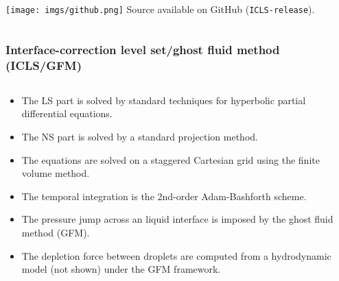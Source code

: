 \begin{frame}[noframenumbering]
\begin{columns}
    \begin{column}{0.2\textwidth}
      \pause
      \vskip4cm
      \centering
      \texttt{[image: imgs/github.png]}
      \vskip0.1cm
      Source available on GitHub (\texttt{ICLS-release}).
    \end{column}
    
  \end{columns}

\end{frame}
\begin{frame}[noframenumbering]
  \frametitle{Interface-correction level set/ghost fluid method (ICLS/GFM)}

  \begin{columns}
    
    \begin{column}{0.8\textwidth}
      
      \begin{bluecolorbox}
        \medskip
        \begin{itemize}
        \item The LS part is solved by standard techniques for hyperbolic partial differential equations. \medskip
        \item The NS part is solved by a standard projection method. \medskip
        \item The equations are solved on a staggered Cartesian grid using the finite volume method. \medskip
        \item The temporal integration is the 2nd-order Adam-Bashforth scheme. \medskip
        \item The pressure jump across an liquid interface is imposed by the ghost fluid method (GFM). \medskip
        \item The depletion force between droplets are computed from a hydrodynamic model (not shown) under the GFM framework. \medskip
        \end{itemize}
      \end{bluecolorbox}
       
    \end{column}
    
  \end{columns}

  \vskip0.5cm
  \pause
  \centering
  
\end{frame}



